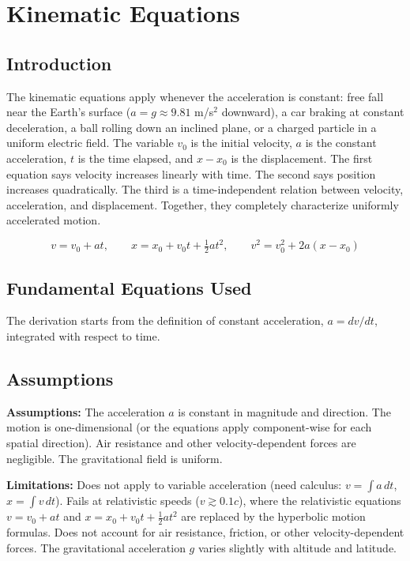 \chapter{Kinematic Equations}

\section*{Introduction}

The kinematic equations apply whenever the acceleration is constant: free fall near the Earth's surface ($a = g \approx 9.81$ m/s$^2$ downward), a car braking at constant deceleration, a ball rolling down an inclined plane, or a charged particle in a uniform electric field. The variable $v_0$ is the initial velocity, $a$ is the constant acceleration, $t$ is the time elapsed, and $x - x_0$ is the displacement. The first equation says velocity increases linearly with time. The second says position increases quadratically. The third is a time-independent relation between velocity, acceleration, and displacement. Together, they completely characterize uniformly accelerated motion.


\[
v = v_0 + at,\qquad x = x_0 + v_0 t + \tfrac{1}{2}at^2,\qquad v^2 = v_0^2 + 2a(x - x_0)
\]

\section*{Fundamental Equations Used}

The derivation starts from the definition of constant acceleration, $a = dv/dt$, integrated with respect to time.

\section*{Assumptions}

\textbf{Assumptions:} The acceleration $a$ is constant in magnitude and direction. The motion is one-dimensional (or the equations apply component-wise for each spatial direction). Air resistance and other velocity-dependent forces are negligible. The gravitational field is uniform.


\textbf{Limitations:} Does not apply to variable acceleration (need calculus: $v = \int a\,dt$, $x = \int v\,dt$). Fails at relativistic speeds ($v \gtrsim 0.1c$), where the relativistic equations $v = v_0 + at$ and $x = x_0 + v_0 t + \frac{1}{2}at^2$ are replaced by the hyperbolic motion formulas. Does not account for air resistance, friction, or other velocity-dependent forces. The gravitational acceleration $g$ varies slightly with altitude and latitude.



